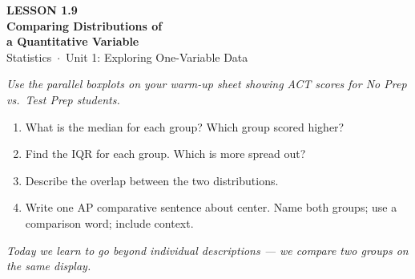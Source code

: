 \documentclass[aspectratio=169, 11pt]{beamer}
\begin{document}
{
\begin{frame}[plain]
  \vspace{2.8cm}
  \hspace{0.55cm}%
  \begin{minipage}{0.9\textwidth}
    {\color{goldacc}\bfseries\small LESSON 1.9}\\[0.5cm]
    {\color{white}\bfseries\LARGE Comparing Distributions of\\[0.25cm]
      a Quantitative Variable}\\[1.4cm]
    {\color{skymid}\small Statistics~$\cdot$~Unit 1: Exploring One-Variable Data}
  \end{minipage}
\end{frame}
}

{
\begin{frame}[t, plain]
  \vspace{1em}%
  \hspace{0.55cm}%
  \begin{minipage}{0.9\textwidth}
    \small
    \textit{Use the parallel boxplots on your warm-up sheet showing ACT scores
    for No Prep vs.\ Test Prep students.}

    \vspace{0.5em}
    \begin{enumerate}
      \setlength{\itemsep}{0.6em}\setlength{\topsep}{0em}
      \item What is the median for each group? Which group scored higher?
      \item Find the IQR for each group. Which is more spread out?
      \item Describe the overlap between the two distributions.
      \item Write one AP comparative sentence about center.
            Name both groups; use a comparison word; include context.
    \end{enumerate}
    \vspace{0.4cm}
    {\color{navy}\itshape\small
      Today we learn to go beyond individual descriptions ---
      we compare two groups on the same display.}
  \end{minipage}
\end{frame}
}
\end{document}
